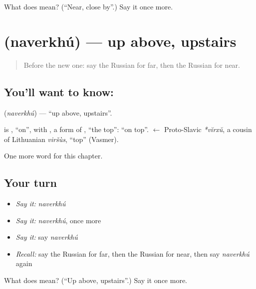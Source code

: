 \begin{tcolorbox}[breakable,colback=teal!4,colframe=teal!35!black,title={Before you move on}]
What does  mean? (\textquotedblleft{}Near, close by\textquotedblright{}.) Say it once more.
\end{tcolorbox}
\section[\texorpdfstring{\ru{наверху} (naverkhú)}{наверху (naverkhú)}]{ (naverkhú) — up above, upstairs}

\label{lesson:RU-C72-above}



\begin{quote}
Before the new one: say the Russian for far, then the Russian for near.
\end{quote}

\subsection*{You'll want to know: }
\textbf{} (\emph{naverkhú}) — \textquotedblleft{}up above, upstairs\textquotedblright{}.

\begin{cousinweb}
\textbf{} is \emph{}, \textquotedblleft{}on\textquotedblright{}, with \emph{}, a form of \emph{}, \textquotedblleft{}the top\textquotedblright{}: \textquotedblleft{}on top\textquotedblright{}. \emph{} $\leftarrow$ Proto-Slavic \emph{*vĭrxŭ}, a cousin of Lithuanian \emph{viršùs}, \textquotedblleft{}top\textquotedblright{} (Vasmer).
\end{cousinweb}

\begin{grammarlens}[title={What you've built}]
One more word for this chapter.
\end{grammarlens}

\subsection*{Your turn}
\begin{itemize}
\raggedright
  \item \emph{Say it:} \emph{naverkhú}
  \item \emph{Say it:} \emph{naverkhú}, once more
  \item \emph{Say it:} say \emph{naverkhú}
  \item \emph{Recall:} say the Russian for far, then the Russian for near, then say \emph{naverkhú} again
\end{itemize}

\begin{tcolorbox}[breakable,colback=teal!4,colframe=teal!35!black,title={Before you move on}]
What does  mean? (\textquotedblleft{}Up above, upstairs\textquotedblright{}.) Say it once more.
\end{tcolorbox}
